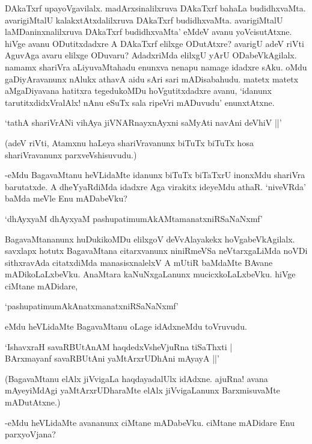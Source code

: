 DAkaTxrf upayoVgavilalx. madArxsinalilxruva DAkaTxrf bahaLa budidhxvaMta. avarigiMtalU kalakxtAtxdalilxruva DAkaTxrf budidhxvaMta. avarigiMtalU laMDaninxnalilxruva DAkaTxrf budidhxvaMta' eMdeV avanu yoVcisutAtxne. hiVge avanu ODutitxdadxre A DAkaTxrf elilxge ODutAtxre? avarigU adeV riVti AguvAga avaru elilxge ODuvaru? AdadxriMda elilxgU yArU ODabeVkAgilalx. namamx shariVra aLiyuvaMtahadu enunxva nenapu namage idadxre sAku. oMdu gaDiyAravanunx nAlukx athavA aidu sAri sari mADisabahudu. matetx matetx aMgaDiyavana hatitxra tegedukoMDu hoVgutitxdadxre avanu, `idanunx tarutitxdidxVralAlx! nAnu eSuTx sala ripeVri mADuvudu' enunxtAtxne.

\begin{shloka}
`tathA shariVrANi vihAya jiVNARnayxnAyxni saMyAti navAni deVhiV ||'
\end{shloka}

(adeV riVti, Atamxnu haLeya shariVravanunx biTuTx biTuTx hosa shariVravanunx parxveVshisuvudu.)


-eMdu BagavaMtanu heVLidaMte idanunx biTuTx biTaTxrU inonxMdu shariVra barutatxde. A dheYyaRdiMda idadxre Aga virakitx ideyeMdu athaR. `niveVRda' baMda meVle Enu mADabeVku?

\begin{shloka}
`dhAyxyaM dhAyxyaM pashupatimumAkAMtamanatxniRSaNaNxmf'
\end{shloka}

BagavaMtananunx huDukikoMDu elilxgoV deVvAlayakekx hoVgabeVkAgilalx. savxlapx hotutx BagavaMtana citarxvanunx niniRmeVSa neVtarxgaLiMda noVDi sithxravAda citatxdiMda manasisxnalelxV A mUtiR baMdaMte BAvane mADikoLaLxbeVku. AnaMtara kaNuNxgaLanunx mucicxkoLaLxbeVku. hiVge ciMtane mADidare,

\begin{shloka}
`pashupatimumAkAnatxmanatxniRSaNaNxmf'
\end{shloka}

eMdu heVLidaMte BagavaMtanu oLage idAdxneMdu toVruvudu.

\begin{shloka}
`IshavxraH savaRBUtAnAM haqdedxVsheVjuRna tiSaThxti |\\
BArxmayanf savaRBUtAni yaMtArxrUDhAni mAyayA ||'
\end{shloka}

(BagavaMtanu elAlx jiVvigaLa haqdayadalUlx idAdxne. ajuRna! avana mAyeyiMdAgi yaMtArxrUDharaMte elAlx jiVvigaLanunx BarxmisuvaMte mADutAtxne.)

-eMdu heVLidaMte avananunx ciMtane mADabeVku. ciMtane mADidare Enu parxyoVjana?

